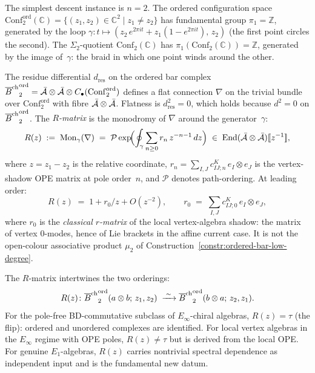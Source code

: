 \begin{construction}
\label{constr:r-matrix-monodromy}
The simplest descent instance is $n=2$. The ordered
configuration space
$\mathrm{Conf}_2^{\mathrm{ord}}(\mathbb C)
=\{(z_1,z_2)\in\mathbb C^2\mid z_1\neq z_2\}$
has fundamental group $\pi_1=\mathbb Z$, generated by the
loop $\gamma\colon t\mapsto
(z_2\,e^{2\pi it}+z_1(1-e^{2\pi it}),\,z_2)$
(the first point circles the second). The $\Sigma_2$-quotient
$\mathrm{Conf}_2(\mathbb C)$ has
$\pi_1(\mathrm{Conf}_2(\mathbb C))=\mathbb Z$, generated by
the image of~$\gamma$: the braid in which one point
winds around the other.

The residue differential $d_{\mathrm{res}}$ on the ordered
bar complex
${\overline{B}^{\mathrm{ch}}}_2^{\mathrm{ord}}=\bar{\mathcal{A}}\otimes\bar{\mathcal{A}}\otimes
C_\bullet(\mathrm{Conf}_2^{\mathrm{ord}})$
defines a flat connection $\nabla$ on the trivial bundle
over $\mathrm{Conf}_2^{\mathrm{ord}}$ with fibre
$\bar{\mathcal{A}}\otimes\bar{\mathcal{A}}$. Flatness is $d_{\mathrm{res}}^2=0$,
which holds because $d^2=0$ on ${\overline{B}^{\mathrm{ch}}}_2^{\mathrm{ord}}$.
The \emph{$R$-matrix} is the monodromy of $\nabla$ around
the generator~$\gamma$:
\begin{equation}\label{eq:r-matrix-monodromy}
R(z)
\;:=\;
\operatorname{Mon}_\gamma(\nabla)
\;=\;
\mathcal P\exp\!\Bigl(
\oint_\gamma\sum_{n\ge 0}r_n\,z^{-n-1}\,dz
\Bigr)
\;\in\;
\operatorname{End}(\bar{\mathcal{A}}\otimes\bar{\mathcal{A}})[\![z^{-1}]\!],
\end{equation}
where $z=z_1-z_2$ is the relative coordinate,
$r_n=\sum_{I,J}c^K_{IJ;n}\,e_I\otimes e_J$ is the
vertex-shadow OPE matrix at pole order~$n$, and $\mathcal P$ denotes
path-ordering.
At leading order:
\begin{equation}\label{eq:r-matrix-leading}
R(z)\;=\;1+r_0/z+O(z^{-2}),
\qquad
r_0\;=\;\sum_{I,J}c^K_{IJ;0}\,e_I\otimes e_J,
\end{equation}
where $r_0$ is the \emph{classical $r$-matrix} of the local
vertex-algebra shadow: the matrix of vertex \(0\)-modes, hence of Lie
brackets in the affine current case.  It is not the open-colour
associative product \(\mu_2\) of
Construction~\ref{constr:ordered-bar-low-degree}.

The $R$-matrix intertwines the two orderings:
\[
R(z)\colon
{\overline{B}^{\mathrm{ch}}}_2^{\mathrm{ord}}(a\otimes b;\,z_1,z_2)
\;\xrightarrow{\;\sim\;}
{\overline{B}^{\mathrm{ch}}}_2^{\mathrm{ord}}(b\otimes a;\,z_2,z_1).
\]
For the pole-free BD-commutative subclass of
$E_\infty$-chiral algebras, $R(z)=\tau$ (the flip): ordered
and unordered complexes are identified. For local
vertex algebras in the $E_\infty$ regime with OPE poles,
$R(z)\ne\tau$ but is derived from the local OPE.
For genuine $E_1$-algebras, $R(z)$ carries nontrivial spectral
dependence as independent input and is the fundamental new datum.
\end{construction}

